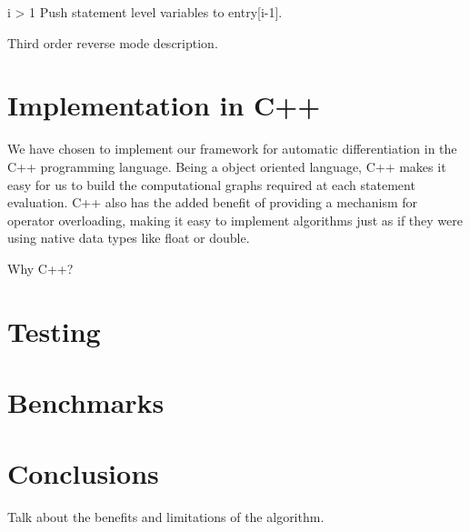 \documentclass[oneside]{article}
\begin{document}
\begin{algorithm*}[!htb]
\begin{algorithmic}[1]
\begin{varwidth}[t]{\linewidth}
\end{varwidth}
\EndFor
\EndFor
\EndFor
\If i > 1
\State Push statement level variables to entry[i-1].
\EndIf
\EndFor
  
\end{algorithmic}
 \end{algorithm*}
 

 
\begin{editnote}
Third order reverse mode description.
\end{editnote}

\section{Implementation in C++}
We have chosen to implement our framework for automatic differentiation in the C++ programming language. Being a object oriented language, C++ makes it easy for us to build the computational graphs required at each statement evaluation. C++ also has the added benefit of providing a mechanism for operator overloading, making it easy to implement algorithms just as if they were using native data types like float or double.

\begin{editnote}
Why C++?
\end{editnote}

\section{Testing}

\section{Benchmarks}

\section{Conclusions}
\begin{editnote}
Talk about the benefits and limitations of the algorithm.
\end{editnote}
\end{document}
